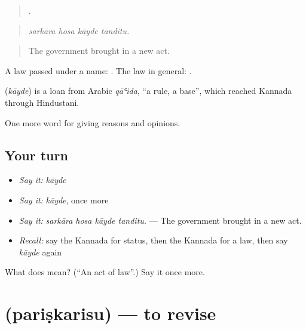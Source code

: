 \begin{quote}
   .
\end{quote}

\begin{quote}
\emph{sarkāra hosa kāyde tanditu.}
\end{quote}

\begin{quote}
The government brought in a new act.
\end{quote}

A law passed under a name: . The law in general: .

\begin{cousinweb}
\textbf{} (\emph{kāyde}) is a loan from Arabic \emph{qāʿida}, \textquotedblleft{}a rule, a base\textquotedblright{}, which reached Kannada through Hindustani.
\end{cousinweb}

\begin{grammarlens}[title={What you've built}]
One more word for giving reasons and opinions.
\end{grammarlens}

\subsection*{Your turn}
\begin{itemize}
\raggedright
  \item \emph{Say it:} \emph{kāyde}
  \item \emph{Say it:} \emph{kāyde}, once more
  \item \emph{Say it:} \emph{sarkāra hosa kāyde tanditu.} — The government brought in a new act.
  \item \emph{Recall:} say the Kannada for status, then the Kannada for a law, then say \emph{kāyde} again
\end{itemize}

\begin{tcolorbox}[breakable,colback=teal!4,colframe=teal!35!black,title={Before you move on}]
What does  mean? (\textquotedblleft{}An act of law\textquotedblright{}.) Say it once more.
\end{tcolorbox}
\section[\texorpdfstring{\kn{ಪರಿಷ್ಕರಿಸು} (pariṣkarisu)}{ಪರಿಷ್ಕರಿಸು (pariṣkarisu)}]{ (pariṣkarisu) — to revise}

